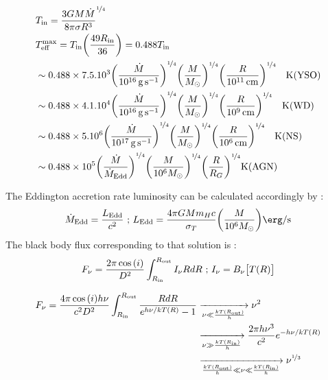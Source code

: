 \documentclass[10pt,a4paper,english]{article}
\let\originalleft\left
\let\originalright\right
\renewcommand{\left}{\mathopen{}\mathclose\bgroup\originalleft}
\renewcommand{\right}{\aftergroup\egroup\originalright}
\begin{document}
\begin{align}
    & T_\mathrm{in} = \frac{3GM\dot{M}}{8\pi\sigma R^3}^{\nicefrac{1}{4}} \\
    & T^\mathrm{max}_\mathrm{eff} = T_\mathrm{in} \left(\frac{49 R_\mathrm{in}}{36}\right) = 0.488T_\mathrm{in} \\
    & \sim 0.488\times7.5.10^3 \left( \frac{\dot{M}}{\SI{e16}{\gram \per \s}}\right)^{\nicefrac{1}{4}}
    \left( \frac{M}{M_{\odot}}\right)^{\nicefrac{1}{4}}
    \left(  \frac{R}{\SI{e11}{\cm}}\right)^{\nicefrac{1}{4}} \quad \text{K(YSO)}     \\
    & \sim 0.488\times 4.1.10^4 \left( \frac{\dot{M}}{\SI{e16}{\gram \per \s}}\right)^{\nicefrac{1}{4}}
    \left( \frac{M}{M_{\odot}}\right)^{\nicefrac{1}{4}}
    \left(  \frac{R}{\SI{e9}{\cm}}\right)^{\nicefrac{1}{4}} \quad \text{K(WD)}     \\
    & \sim 0.488\times 5.10^6  \left( \frac{\dot{M}}{\SI{e17}{\gram \per \s}}\right)^{\nicefrac{1}{4}}
    \left( \frac{M}{M_{\odot}}\right)^{\nicefrac{1}{4}}
    \left(  \frac{R}{\SI{e6}{\cm}}\right)^{\nicefrac{1}{4}} \quad \text{K(NS)}     \\
    &\sim 0.488 \times 10^5 \left(  \frac{\dot{M}}{\dot{M}_\mathrm{Edd}}\right)^{\nicefrac{1}{4}}
    \left( \frac{M}{10^6 M_{\odot}}\right)^{\nicefrac{1}{4}}
    \left(  \frac{R}{R_G}\right)^{\nicefrac{1}{4}} \text{K(AGN)}
\end{align}

The Eddington accretion rate luminosity can be calculated accordingly by :
\begin{equation}
    \dot{M}_\mathrm{Edd} = \frac{L_\mathrm{Edd}}{c^2} \text{ ; } L_\mathrm{Edd} = \frac{4\pi GMm_Hc}{\sigma_T}
    \left( \frac{M}{10^6M_{\odot}}\right) \si{\erg \per \s}
\end{equation}
The black body flux corresponding to that solution is :
\begin{equation}
    F_{\nu} = \frac{2\pi \cos{(i)}}{D^2} \int_{R_\mathrm{in}}^{R_\mathrm{out}} I_{\nu}RdR \text{  ;  }
    I_{\nu} = B_{\nu}\big[ T(R)\big] \\
\end{equation}

\begin{align}
    F_{\nu} = \frac{4\pi \cos{(i)}h\nu}{c^2D^2} \int_{R_\mathrm{in}}^{R_\mathrm{out}}
    \frac{RdR}{e^{h\nu/kT(R)}-1}
    &\xrightarrow[\nu \ll \frac{kT(R_\mathrm{out})}{h}]{} \nu^2  \\
    & \xrightarrow[\nu \gg \frac{kT(R_\mathrm{in})}{h}]{} \frac{2\pi h \nu^3}{c^2} e^{-h\nu/kT(R)}  \\
    & \xrightarrow[\frac{kT(R_\mathrm{out})}{h}\ll\nu \ll \frac{kT(R_\mathrm{in})}{h}]{} \nu^{\nicefrac{1}{3}}
\end{align}
\end{document}
